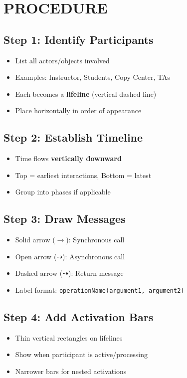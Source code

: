 \chapter{PROCEDURE} 
\label{ch:procedure}
\section*{Step 1: Identify Participants}
\begin{itemize}
    \item List all actors/objects involved
    \item Examples: Instructor, Students, Copy Center, TAs
    \item Each becomes a \textbf{lifeline} (vertical dashed line)
    \item Place horizontally in order of appearance
\end{itemize}

\section*{Step 2: Establish Timeline}
\begin{itemize}
    \item Time flows \textbf{vertically downward}
    \item Top = earliest interactions, Bottom = latest
    \item Group into phases if applicable
\end{itemize}

\section*{Step 3: Draw Messages}
\begin{itemize}
    \item Solid arrow (\(\rightarrow\)): Synchronous call
    \item Open arrow (\(\dashrightarrow\)): Asynchronous call  
    \item Dashed arrow (\(\dashrightarrow\)): Return message
    \item Label format: \texttt{operationName(argument1, argument2)}
\end{itemize}

\section*{Step 4: Add Activation Bars}
\begin{itemize}
    \item Thin vertical rectangles on lifelines
    \item Show when participant is active/processing
    \item Narrower bars for nested activations
\end{itemize}

